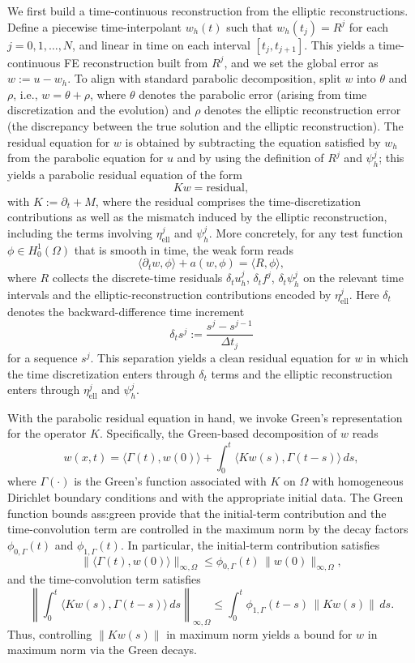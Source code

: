 \documentclass[11pt]{article}
\begin{document}
We first build a time-continuous reconstruction from the elliptic reconstructions. Define a piecewise time-interpolant $w_h(t)$ such that $w_h(t_j) = R^j$ for each $j = 0,1,\dots,N$, and linear in time on each interval $[t_j,t_{j+1}]$. This yields a time-continuous FE reconstruction built from $R^j$, and we set the global error as $w := u - w_h$. To align with standard parabolic decomposition, split $w$ into $\theta$ and $\rho$, i.e., $w = \theta + \rho$, where $\theta$ denotes the parabolic error (arising from time discretization and the evolution) and $\rho$ denotes the elliptic reconstruction error (the discrepancy between the true solution and the elliptic reconstruction). The residual equation for $w$ is obtained by subtracting the equation satisfied by $w_h$ from the parabolic equation for $u$ and by using the definition of $R^j$ and $\psi_h^j$; this yields a parabolic residual equation of the form
\[
K w = \text{residual},
\]
with $K := \partial_t + M$, where the residual comprises the time-discretization contributions as well as the mismatch induced by the elliptic reconstruction, including the terms involving $\eta^j_{\mathrm{ell}}$ and $\psi_h^j$. More concretely, for any test function $\phi \in H^1_0(\Omega)$ that is smooth in time, the weak form reads
\[
\langle \partial_t w, \phi \rangle + a(w,\phi) = \langle R, \phi \rangle,
\]
where $R$ collects the discrete-time residuals $\delta_t u_h^j$, $\delta_t f^j$, $\delta_t \psi_h^j$ on the relevant time intervals and the elliptic-reconstruction contributions encoded by $\eta^j_{\mathrm{ell}}$. Here $\delta_t$ denotes the backward-difference time increment
\[
\delta_t s^j := \frac{s^j - s^{j-1}}{\Delta t_j}
\]
for a sequence $s^j$. This separation yields a clean residual equation for $w$ in which the time discretization enters through $\delta_t$ terms and the elliptic reconstruction enters through $\eta^j_{\mathrm{ell}}$ and $\psi_h^j$.

With the parabolic residual equation in hand, we invoke Green's representation for the operator $K$. Specifically, the Green-based decomposition of $w$ reads
\[
w(x,t) = \langle \Gamma(t), w(0) \rangle + \int_0^t \langle K w(s), \Gamma(t-s) \rangle\, ds,
\]
where $\Gamma(\cdot)$ is the Green's function associated with $K$ on $\Omega$ with homogeneous Dirichlet boundary conditions and with the appropriate initial data. The Green function bounds ass:green provide that the initial-term contribution and the time-convolution term are controlled in the maximum norm by the decay factors $\phi_{0,\Gamma}(t)$ and $\phi_{1,\Gamma}(t)$. In particular, the initial-term contribution satisfies
\[
\|\langle \Gamma(t), w(0) \rangle\|_{\infty,\Omega} \le \phi_{0,\Gamma}(t)\, \|w(0)\|_{\infty,\Omega},
\]
and the time-convolution term satisfies
\[
\left\|\int_0^t \langle K w(s), \Gamma(t-s) \rangle\, ds\right\|_{\infty,\Omega}
\le \int_0^t \phi_{1,\Gamma}(t-s)\, \|K w(s)\|\, ds.
\]
Thus, controlling $\|K w(s)\|$ in maximum norm yields a bound for $w$ in maximum norm via the Green decays.
\end{document}
